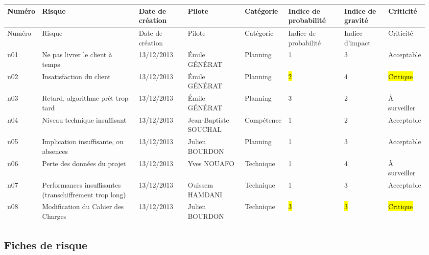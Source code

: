 \documentclass[a4paper,11pt,french]{article}
\begin{document}
\begin{landscape}

\begin{longtable}{|m{1.5cm}|m{4cm}|m{3cm}|m{3.2cm}|m{2.2cm}|m{2cm}|m{2cm}|m{2.2cm}|}
\hline
\rowcolor[gray]{.8}
Numéro & Risque & Date de création & Pilote & Catégorie \footnotemark[1] & Indice de probabilité & Indice de gravité & Criticité \footnotemark[2] \\ 
\hline
\endfirsthead
\hline
\rowcolor[gray]{.8}
Numéro & Risque & Date de création & Pilote & Catégorie \footnotemark[1] & Indice de probabilité & Indice d'impact & Criticité \footnotemark[2] \\ 
\hline

\endhead
n01 & Ne pas livrer le client à temps & 13/12/2013 & Émile GÉNÉRAT & Planning & 1 & 3 & Acceptable \\
\hline
n02 & Insatisfaction du client & 13/12/2013 & Émile GÉNÉRAT & Planning & \hl{2} & 4 &  \hl{Critique}\\
\hline
n03 & Retard, algorithme prêt trop tard & 13/12/2013 & Émile GÉNÉRAT & Planning & 3 & 2 & À surveiller \\
\hline
n04 & Niveau technique insuffisant & 13/12/2013 & Jean-Baptiste SOUCHAL &  Compétence & 1 & 2 & Acceptable \\
\hline
n05 & Implication insuffisante, ou absences & 13/12/2013 & Julien BOURDON & Planning & 1 & 3 & Acceptable \\
\hline
n06 & Perte des données du projet & 13/12/2013 & Yves NOUAFO & Technique & 1 & 4 & À surveiller \\
\hline
n07 & Performances insuffisantes (transchiffrement trop long) & 13/12/2013 & Ouissem HAMDANI & Technique & 1 & 3 & Acceptable \\
\hline
n08 & Modification du Cahier des Charges & 13/12/2013 & Julien BOURDON & Technique & \hl{3} & \hl{3} & \hl{Critique} \\
\hline

\end{longtable}

\end{landscape}

\newpage

\subsection{Fiches de risque}
\end{document}
